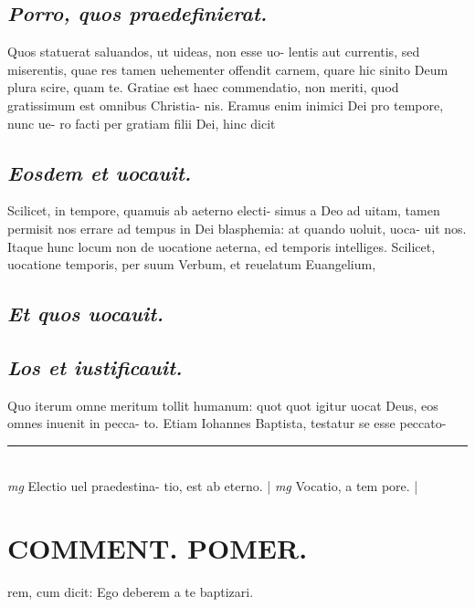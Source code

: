 \documentclass{article}
\begin{document}
\begin{pages}
\subsection*{\textit{Porro, quos praedefinierat. }}\pstart Quos statuerat saluandos, ut uideas, non esse uo- lentis aut currentis, sed miserentis, quae res tamen uehementer offendit carnem, quare hic sinito Deum plura scire, quam te. Gratiae est haec commendatio, non meriti, quod gratissimum est omnibus Christia- nis. Eramus enim inimici Dei pro tempore, nunc ue- ro facti per gratiam filii Dei, hinc dicit  \pend
{}
{}
\subsection*{\textit{Eosdem et uocauit. }}\pstart Scilicet, in tempore, quamuis ab aeterno electi- simus a Deo ad uitam, tamen permisit nos errare ad tempus in Dei blasphemia: at quando uoluit, uoca- uit nos. Itaque hunc locum non de uocatione aeterna, ed temporis intelliges.  \pend\pstart Scilicet, uocatione temporis, per suum Verbum, et reuelatum Euangelium,  \pend
{}
{}
\subsection*{\textit{Et quos uocauit. }}
{}
\subsection*{\textit{Los et iustificauit. }}\pstart Quo iterum omne meritum tollit humanum: quot quot igitur uocat Deus, eos omnes inuenit in pecca- to. Etiam Iohannes Baptista, testatur se esse peccato-  \pend
\vspace{0.5cm}\noindent
\vspace{0.2cm}\rule{1cm}{0.2pt}\\ 
\hspace{0.2cm}\textit{mg}
\footnotesize Electio uel praedestina- tio, est ab eterno. 
\normalsize| 
\hspace{0.2cm}\textit{mg}
\footnotesize Vocatio, a tem pore. 
\normalsize| 
\section*{COMMENT. POMER.  }\pstart rem, cum dicit: Ego deberem a te baptizari.   \pend
{}
{}

\end{pages}
\end{document}
